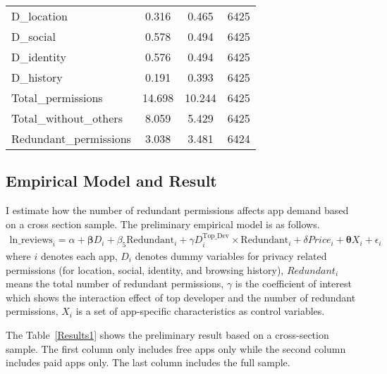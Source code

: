\documentclass[12pt]{article}
\begin{document}
\begin{table}[ht]
\begin{tabular}{l c c  c}
		D\_location  &0.316 & 0.465  & 6425\\
		D\_social & 0.578 & 0.494  & 6425\\
		D\_identity & 0.576 & 0.494  & 6425\\
		D\_history &  0.191 & 0.393  & 6425\\
		Total\_permissions & 14.698 & 10.244  & 6425\\
		Total\_without\_others &  8.059 & 5.429  & 6425\\
		Redundant\_permissions & 3.038 & 3.481  & 6424\\
		\hline\hline
	\end{tabular}
\end{table}

\subsection{Empirical Model and Result}


I estimate how the number of redundant permissions affects app demand based on a cross section sample. The preliminary empirical model is as follows.
\begin{align}
\text{ln\_reviews}_i = \alpha + \boldsymbol{\beta} D_{i}+\beta_5 \text{Redundant}_{i}+\gamma D_i^\text{Top\_Dev}\times\text{Redundant}_i +\delta Price_i + \boldsymbol{\theta}X_i +\epsilon_i
\end{align}
where $i$ denotes each app, $D_{i}$ denotes dummy variables for privacy related permissions (for location, social, identity, and browsing history), $Redundant_i$ means the total number of redundant permissions, $\gamma$ is the coefficient of interest which shows the interaction effect of top developer and the number of redundant permissions, $X_i$ is a set of app-specific characteristics as control variables.

The Table~\ref{Results1} shows the preliminary result based on a cross-section sample. The first column only includes free apps only while the second column includes paid apps only. The last column includes the full sample. 
\end{document}
